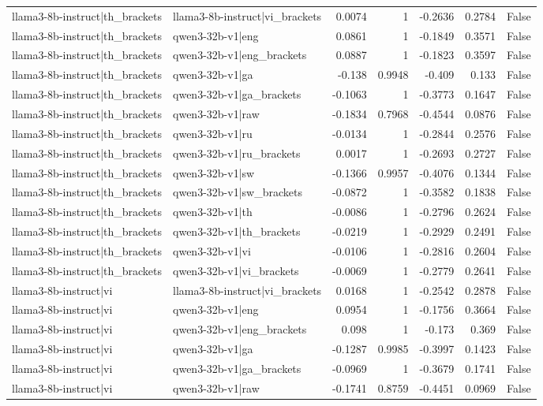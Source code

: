 \begin{table}
\begin{tabular}{l l r r r r l}
llama3-8b-instruct|th_brackets & llama3-8b-instruct|vi_brackets & 0.0074 & 1 & -0.2636 & 0.2784 & False \\
llama3-8b-instruct|th_brackets & qwen3-32b-v1|eng & 0.0861 & 1 & -0.1849 & 0.3571 & False \\
llama3-8b-instruct|th_brackets & qwen3-32b-v1|eng_brackets & 0.0887 & 1 & -0.1823 & 0.3597 & False \\
llama3-8b-instruct|th_brackets & qwen3-32b-v1|ga & -0.138 & 0.9948 & -0.409 & 0.133 & False \\
llama3-8b-instruct|th_brackets & qwen3-32b-v1|ga_brackets & -0.1063 & 1 & -0.3773 & 0.1647 & False \\
llama3-8b-instruct|th_brackets & qwen3-32b-v1|raw & -0.1834 & 0.7968 & -0.4544 & 0.0876 & False \\
llama3-8b-instruct|th_brackets & qwen3-32b-v1|ru & -0.0134 & 1 & -0.2844 & 0.2576 & False \\
llama3-8b-instruct|th_brackets & qwen3-32b-v1|ru_brackets & 0.0017 & 1 & -0.2693 & 0.2727 & False \\
llama3-8b-instruct|th_brackets & qwen3-32b-v1|sw & -0.1366 & 0.9957 & -0.4076 & 0.1344 & False \\
llama3-8b-instruct|th_brackets & qwen3-32b-v1|sw_brackets & -0.0872 & 1 & -0.3582 & 0.1838 & False \\
llama3-8b-instruct|th_brackets & qwen3-32b-v1|th & -0.0086 & 1 & -0.2796 & 0.2624 & False \\
llama3-8b-instruct|th_brackets & qwen3-32b-v1|th_brackets & -0.0219 & 1 & -0.2929 & 0.2491 & False \\
llama3-8b-instruct|th_brackets & qwen3-32b-v1|vi & -0.0106 & 1 & -0.2816 & 0.2604 & False \\
llama3-8b-instruct|th_brackets & qwen3-32b-v1|vi_brackets & -0.0069 & 1 & -0.2779 & 0.2641 & False \\
llama3-8b-instruct|vi & llama3-8b-instruct|vi_brackets & 0.0168 & 1 & -0.2542 & 0.2878 & False \\
llama3-8b-instruct|vi & qwen3-32b-v1|eng & 0.0954 & 1 & -0.1756 & 0.3664 & False \\
llama3-8b-instruct|vi & qwen3-32b-v1|eng_brackets & 0.098 & 1 & -0.173 & 0.369 & False \\
llama3-8b-instruct|vi & qwen3-32b-v1|ga & -0.1287 & 0.9985 & -0.3997 & 0.1423 & False \\
llama3-8b-instruct|vi & qwen3-32b-v1|ga_brackets & -0.0969 & 1 & -0.3679 & 0.1741 & False \\
llama3-8b-instruct|vi & qwen3-32b-v1|raw & -0.1741 & 0.8759 & -0.4451 & 0.0969 & False \\

\end{tabular}
\end{table}

